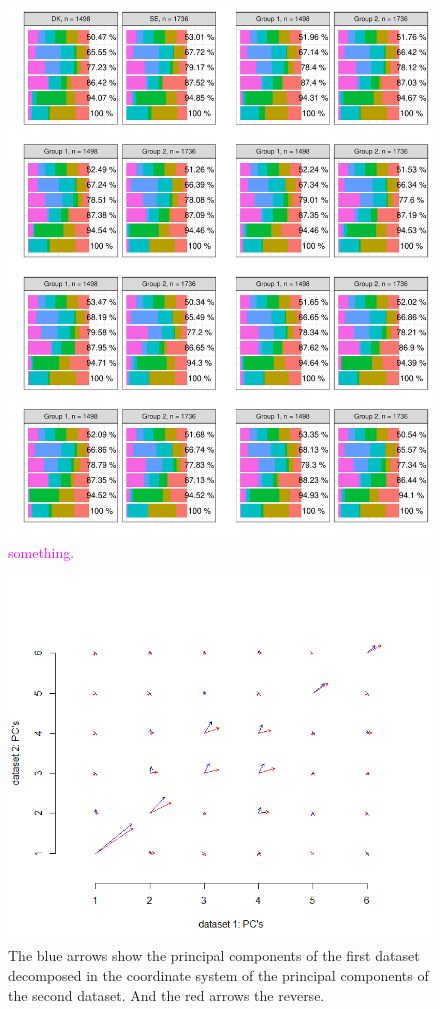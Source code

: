 \documentclass[titlepage,11pt,twoside]{article}
\newcommand{\hl}[1]{\textcolor{magenta}{#1}}
\begin{document}
\begin{figure}
\center
\includegraphics[scale = 0.8]{essWallyPCADSC.pdf}
\caption{\hl{something.}}
\label{plotESSPCADSCWally}
\end{figure}

\begin{figure}
\center
\includegraphics[scale = 0.8]{essHairplot.png}
\caption{The blue arrows show the principal components of the first dataset decomposed in the coordinate system of the principal components of the second dataset. And the red arrows the reverse.}
\label{plotESSHairplot}
\end{figure}
\end{document}
